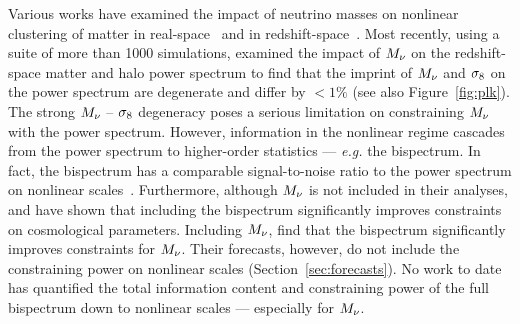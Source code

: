 Various works have examined the impact of neutrino masses on nonlinear clustering 
of matter in 
real-space~\citep[\emph{e.g.}][]{brandbyge2008, saito2008, wong2008, saito2009, viel2010, agarwal2011, bird2012, castorina2015, banerjee2016} 
and in redshift-space~\citep{marulli2011, castorina2015, upadhye2016}. Most recently, 
using a suite of more than 1000 simulations, \cite{villaescusa-navarro2018} 
examined the impact of $M_\nu$ on the redshift-space matter and halo power 
spectrum to find that the imprint of $M_\nu$ and $\sigma_8$ on the power spectrum are 
degenerate and differ by $< 1\%$ (see also Figure~\ref{fig:plk}). The strong $M_\nu$ -- $\sigma_8$ degeneracy
poses a serious limitation on constraining $M_\nu$ with the power spectrum. 
However, information in the nonlinear regime cascades from the power spectrum 
to higher-order statistics --- \emph{e.g.} the bispectrum. In fact, the 
bispectrum has a comparable signal-to-noise ratio to the power spectrum
on nonlinear scales~\citep{sefusatti2005, chan2017}. Furthermore, although $M_\nu$ 
is not included in their analyses, \cite{sefusatti2006} and \cite{yankelevich2019} 
have shown that including the bispectrum significantly improves constraints on 
cosmological parameters. %
Including $M_\nu$, \cite{chudaykin2019} find that the bispectrum significantly 
improves constraints for $M_\nu$. Their forecasts, however, do not include the 
constraining power on nonlinear scales (Section~\ref{sec:forecasts}). 
No work to date has quantified the total information content and constraining 
power of the full bispectrum down to nonlinear scales --- especially for $M_\nu$. 

